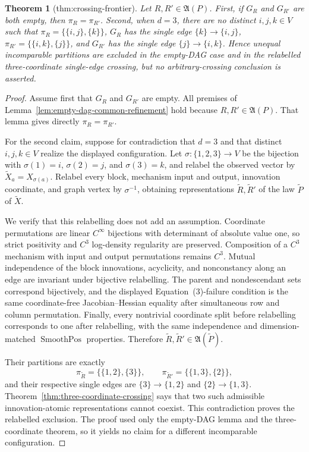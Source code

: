 \documentclass{article}
\newtheorem{theorem}{Theorem}
\begin{document}
\begin{theorem}[thm:crossing-frontier]\label{thm:crossing-frontier}
Let \(R,R'\in\mathfrak A(P)\). First, if \(G_R\) and \(G_{R'}\) are both empty, then \(\pi_R=\pi_{R'}\). Second, when \(d=3\), there are no distinct \(i,j,k\in V\) such that \(\pi_R=\{\{i,j\},\{k\}\}\), \(G_R\) has the single edge \(\{k\}\to\{i,j\}\), \(\pi_{R'}=\{\{i,k\},\{j\}\}\), and \(G_{R'}\) has the single edge \(\{j\}\to\{i,k\}\). Hence unequal incomparable partitions are excluded in the empty-DAG case and in the relabelled three-coordinate single-edge crossing, but no arbitrary-crossing conclusion is asserted.
\end{theorem}
\begin{proof}
Assume first that \(G_R\) and \(G_{R'}\) are empty.  All premises of
Lemma~\ref{lem:empty-dag-common-refinement} hold because
\(R,R'\in\mathfrak A(P)\).  That lemma gives directly
\(\pi_R=\pi_{R'}\).

For the second claim, suppose for contradiction that \(d=3\) and that distinct
\(i,j,k\in V\) realize the displayed configuration.  Let
\(\sigma:\{1,2,3\}\to V\) be the bijection with
\(\sigma(1)=i\), \(\sigma(2)=j\), and \(\sigma(3)=k\), and relabel the observed
vector by \(\widetilde X_a=X_{\sigma(a)}\).  Relabel every block, mechanism
input and output, innovation coordinate, and graph vertex by \(\sigma^{-1}\),
obtaining representations \(\widetilde R,\widetilde R'\) of the law
\(\widetilde P\) of \(\widetilde X\).

We verify that this relabelling does not add an assumption.  Coordinate
permutations are linear \(C^\infty\) bijections with determinant of absolute
value one, so strict positivity and \(C^3\) log-density regularity are
preserved.  Composition of a \(C^3\) mechanism with input and output
permutations remains \(C^3\).  Mutual independence of the block innovations,
acyclicity, and nonconstancy along an edge are invariant under bijective
relabelling.  The parent and nondescendant sets correspond bijectively, and
the displayed Equation~(3)-failure condition is the same coordinate-free
Jacobian--Hessian equality after simultaneous row and column permutation.
Finally, every nontrivial coordinate split before relabelling corresponds to
one after relabelling, with the same independence and
dimension-matched \(\operatorname{SmoothPos}\) properties.  Therefore
\(\widetilde R,\widetilde R'\in\mathfrak A(\widetilde P)\).

Their partitions are exactly
\[
 \pi_{\widetilde R}=\{\{1,2\},\{3\}\},\qquad
 \pi_{\widetilde R'}=\{\{1,3\},\{2\}\},
\]
and their respective single edges are
\(\{3\}\to\{1,2\}\) and \(\{2\}\to\{1,3\}\).
Theorem~\ref{thm:three-coordinate-crossing} says that two such admissible
innovation-atomic representations cannot coexist.  This contradiction proves
the relabelled exclusion.  The proof used only the empty-DAG lemma and the
three-coordinate theorem, so it yields no claim for a different incomparable
configuration.
\end{proof}
\end{document}
